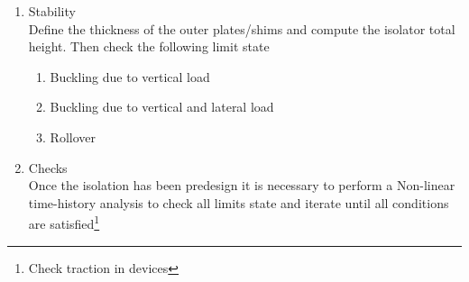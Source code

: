 \documentclass{article}
\begin{document}
\begin{enumerate}
\item{Stability}\\
Define the thickness of the outer plates/shims and compute the isolator total height. Then check the following limit state
\begin{enumerate}
    \item Buckling due to vertical load
    \item Buckling due to vertical and lateral load
    \item Rollover
\end{enumerate}
\item {Checks}\\
Once the isolation has been predesign it is necessary to perform a Non-linear time-history analysis to check all limits state and iterate until all conditions are satisfied\footnote{ Check traction in devices}
\end{enumerate}
\end{document}
